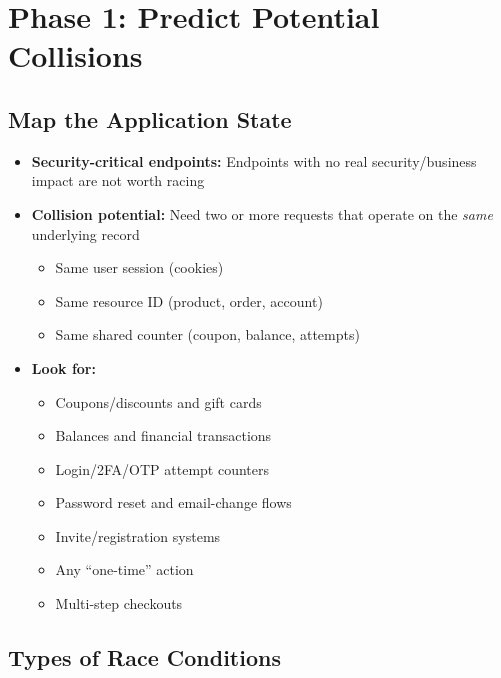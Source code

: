 \documentclass[11pt]{article}
\begin{document}
\section{Phase 1: Predict Potential Collisions}

\subsection{Map the Application State}

\begin{checklistbox}
\begin{itemize}
    \item[\checkmark] \textbf{Security-critical endpoints:} Endpoints with no real security/business impact are not worth racing
    \item[\checkmark] \textbf{Collision potential:} Need two or more requests that operate on the \emph{same} underlying record
    \begin{itemize}
        \item Same user session (cookies)
        \item Same resource ID (product, order, account)
        \item Same shared counter (coupon, balance, attempts)
    \end{itemize}
    \item[\checkmark] \textbf{Look for:}
    \begin{itemize}
        \item Coupons/discounts and gift cards
        \item Balances and financial transactions
        \item Login/2FA/OTP attempt counters
        \item Password reset and email-change flows
        \item Invite/registration systems
        \item Any ``one-time'' action
        \item Multi-step checkouts
    \end{itemize}
\end{itemize}
\end{checklistbox}

\subsection{Types of Race Conditions}
\end{document}
